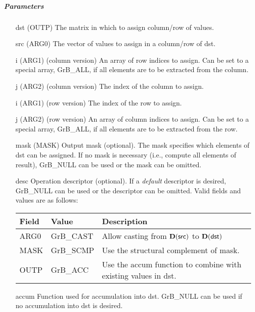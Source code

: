 \subparagraph{Parameters}

\begin{itemize}[leftmargin=1.1in]
    \item[{\sf dst}]   (OUTP) The matrix in which to assign column/row of values.
    \item[{\sf src}]   (ARG0) The vector of values to assign in a column/row of dst.

    \item[{\sf i}]     (ARG1) (column version) An array of row indices to assign. Can
                              be set to a special array, {\sf GrB\_ALL}, if all elements
                              are to be extracted from the column.
    \item[{\sf j}]     (ARG2) (column version) The index of the column to assign.

    \item[{\sf i}]     (ARG1) (row version) The index of the row to assign.
    \item[{\sf j}]     (ARG2) (row version) An array of column indices to assign. Can
                              be set to a special array, {\sf GrB\_ALL}, if all elements
                              are to be extracted from the row.

    \item[{\sf mask}]  (MASK) Output mask (optional). The mask
    specifies which elements of {\sf dst} can be assigned.
    If no mask is necessary (i.e., compute all elements of result),
    {\sf GrB\_NULL} can be used or the mask can be omitted.

    \item[{\sf desc}]   Operation descriptor (optional). If a
    \emph{default} descriptor is desired, {\sf GrB\_NULL} can be
    used or the descriptor can be omitted.  Valid fields and values are as follows: \\
    \begin{tabular}{lll}
    Field  & Value & Description \\
    \hline
    {\sf ARG0} & {\sf GrB\_CAST} & Allow casting from $\bold{D}({\sf src})$ to $\bold{D}({\sf dst})$ \\
    {\sf MASK} & {\sf GrB\_SCMP} & Use the structural complement of {\sf mask}. \\
    {\sf OUTP} & {\sf GrB\_ACC}  & Use the {\sf accum} function to combine with existing values in {\sf dst}.\\
    \end{tabular}

    \item[{\sf accum}] Function used for accumulation into dst.  {\sf GrB\_NULL}
                       can be used if no accumulation into dst is desired.
\end{itemize}

